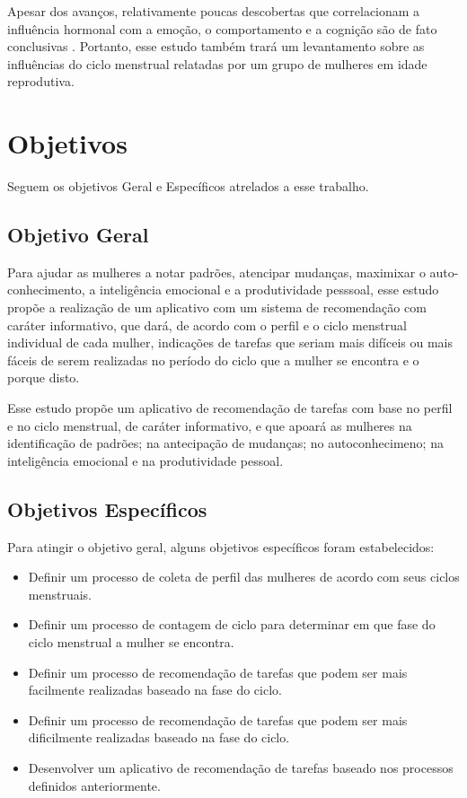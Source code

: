 Apesar dos avanços, relativamente poucas descobertas que correlacionam a influência hormonal com a emoção, o comportamento e a cognição são de fato conclusivas \cite{poroma2014}. Portanto, esse estudo também trará um levantamento sobre as influências do ciclo menstrual relatadas por um grupo de mulheres em idade reprodutiva.


\section*{Objetivos}

Seguem os objetivos Geral e Específicos atrelados a esse trabalho.

\subsection*{Objetivo Geral}

Para ajudar as mulheres a notar padrões, atencipar mudanças, maximixar o auto-conhecimento, a inteligência emocional e a produtividade pesssoal, esse estudo propõe a realização de um aplicativo com um sistema de recomendação com caráter informativo, que dará, de acordo com o perfil e o ciclo menstrual individual de cada mulher, indicações de tarefas que seriam mais difíceis ou mais fáceis de serem realizadas no período do ciclo que a mulher se encontra e o porque disto.

Esse estudo propõe um aplicativo de recomendação de tarefas com base no perfil e no ciclo menstrual, de caráter informativo, e que apoará as mulheres na identificação de padrões; na antecipação de mudanças; no autoconhecimeno; na inteligência emocional e na produtividade pessoal.

\subsection*{Objetivos Específicos}

Para atingir o objetivo geral, alguns objetivos específicos foram estabelecidos:

\begin{itemize}

        \item Definir um processo de coleta de perfil das mulheres de acordo com seus ciclos menstruais.

        \item Definir um processo de contagem de ciclo para determinar em que fase do ciclo menstrual a mulher se encontra. 

        \item Definir um processo de recomendação de tarefas que podem ser  mais facilmente realizadas baseado na fase do ciclo. 

        \item Definir um processo de recomendação de tarefas que podem ser mais dificilmente realizadas baseado na fase do ciclo.

        \item Desenvolver um aplicativo de recomendação de tarefas baseado nos processos definidos anteriormente. 

\end{itemize}


